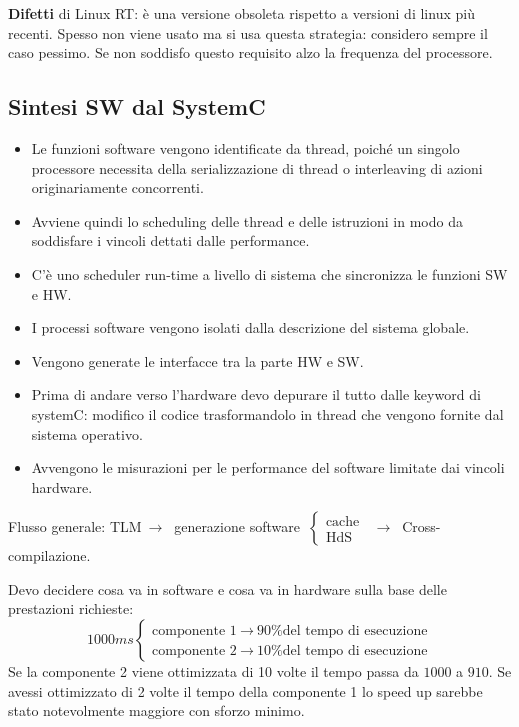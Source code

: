 \documentclass[a4paper]{article}
\theoremstyle{definition}
\begin{document}
			\textbf{Difetti} di Linux RT: è una versione obsoleta rispetto a versioni di linux più recenti. Spesso non viene usato ma si usa questa strategia: considero sempre il caso pessimo. Se non soddisfo questo requisito alzo la frequenza del processore.
			
		\subsection{Sintesi SW dal SystemC}
		
			\begin{itemize}
				\item Le funzioni software vengono identificate da thread, poiché un singolo processore necessita della serializzazione di thread o interleaving di azioni originariamente concorrenti.
			
				\item Avviene quindi lo scheduling delle thread e delle istruzioni in modo da soddisfare i vincoli dettati dalle performance.
				
				\item C'è uno scheduler run-time a livello di sistema che sincronizza le funzioni SW e HW.
			
				\item I processi software vengono isolati dalla descrizione del sistema globale.
				
				\item Vengono generate le interfacce tra la parte HW e SW.
				
				\item Prima di andare verso l'hardware devo depurare il tutto dalle keyword di systemC: modifico il codice trasformandolo in thread che vengono fornite dal sistema operativo.
				
				\item Avvengono le misurazioni per le performance del software limitate dai vincoli hardware.
			\end{itemize}
			
			Flusso generale: TLM$\ \rightarrow\ $ generazione software $\ \begin{cases}
				\text{cache} \\
				\text{HdS}
			\end{cases} $ $\ \rightarrow\ $ Cross-compilazione.
			
			\noindent
			Devo decidere cosa va in software e cosa va in hardware sulla base delle prestazioni richieste:
			\[
				1000 ms
				\begin{cases}
					\text{componente 1}\ \rightarrow\ \text{90\% del tempo di esecuzione}\\
					\text{componente 2}\ \rightarrow\ \text{10\% del tempo di esecuzione}
				\end{cases}
			\]
			Se la componente 2 viene ottimizzata di 10 volte il tempo passa da $ 1000 $ a $ 910 $. Se avessi ottimizzato di 2 volte il tempo della componente 1 lo speed up sarebbe stato notevolmente maggiore con sforzo minimo.
			
\end{document}
